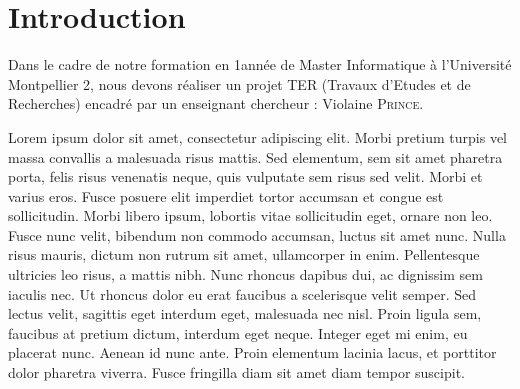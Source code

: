 \chapter*{Introduction}
Dans le cadre de notre formation en 1\iere année de Master Informatique à l'Université Montpellier 2, nous devons réaliser un projet TER (Travaux d'Etudes et de Recherches) encadré par un enseignant chercheur : Violaine \textsc{Prince}.

Lorem ipsum dolor sit amet, consectetur adipiscing elit. Morbi pretium turpis vel massa convallis a malesuada risus mattis. Sed elementum, sem sit amet pharetra porta, felis risus venenatis neque, quis vulputate sem risus sed velit. Morbi et varius eros. Fusce posuere elit imperdiet tortor accumsan et congue est sollicitudin. Morbi libero ipsum, lobortis vitae sollicitudin eget, ornare non leo. Fusce nunc velit, bibendum non commodo accumsan, luctus sit amet nunc. Nulla risus mauris, dictum non rutrum sit amet, ullamcorper in enim. Pellentesque ultricies leo risus, a mattis nibh. Nunc rhoncus dapibus dui, ac dignissim sem iaculis nec. Ut rhoncus dolor eu erat faucibus a scelerisque velit semper. Sed lectus velit, sagittis eget interdum eget, malesuada nec nisl. Proin ligula sem, faucibus at pretium dictum, interdum eget neque. Integer eget mi enim, eu placerat nunc. Aenean id nunc ante. Proin elementum lacinia lacus, et porttitor dolor pharetra viverra. Fusce fringilla diam sit amet diam tempor suscipit. 
